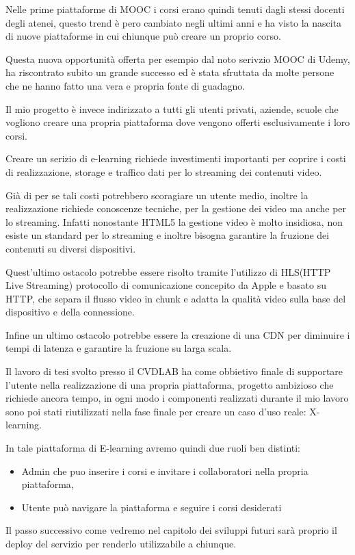 Nelle prime piattaforme di MOOC i corsi erano quindi tenuti dagli stessi docenti degli atenei, questo trend è pero cambiato negli ultimi anni e ha visto la nascita di nuove piattaforme in cui chiunque può creare un proprio corso.

Questa nuova opportunità offerta per esempio dal noto serivzio MOOC di Udemy, ha riscontrato subito un grande successo ed è stata sfruttata da molte persone che ne hanno fatto una vera e propria fonte di guadagno. 

Il mio progetto è invece indirizzato a tutti gli utenti privati, aziende, scuole che vogliono creare una propria piattaforma dove vengono offerti esclusivamente i loro corsi.

Creare un serizio di e-learning richiede investimenti importanti per coprire i costi di realizzazione, storage e traffico dati per lo streaming dei contenuti video.

Già di per se tali costi potrebbero scoragiare un utente medio, inoltre la realizzazione richiede conoscenze tecniche, per la gestione dei video ma anche per lo streaming.
Infatti nonostante HTML5 la gestione video è molto insidiosa, non esiste un standard per lo streaming e inoltre bisogna garantire la fruzione dei contenuti su diversi dispositivi.

Quest'ultimo ostacolo potrebbe essere risolto tramite l'utilizzo di HLS(HTTP Live Streaming) protocollo di comunicazione concepito da Apple e basato su HTTP, che separa il flusso video in chunk e adatta la qualità video sulla base del dispositivo e della connessione.

Infine un ultimo ostacolo potrebbe essere la creazione di una CDN per diminuire i tempi di latenza e garantire la fruzione su larga scala.

Il lavoro di tesi svolto presso il CVDLAB ha come obbietivo finale di supportare l'utente nella realizzazione di una propria piattaforma, progetto ambizioso che richiede ancora tempo, in ogni modo i componenti realizzati durante il mio lavoro sono poi stati riutilizzati nella fase finale per creare un caso d'uso reale: X-learning.


In tale piattaforma di E-learning avremo quindi due ruoli ben distinti: 
\begin{itemize}
\item Admin che puo inserire i corsi e invitare i collaboratori nella propria piattaforma,
\item Utente può navigare la piattaforma e seguire i corsi desiderati
\end{itemize}
Il passo successivo come vedremo nel capitolo dei sviluppi futuri sarà proprio il deploy del servizio per renderlo utilizzabile a chiunque.

